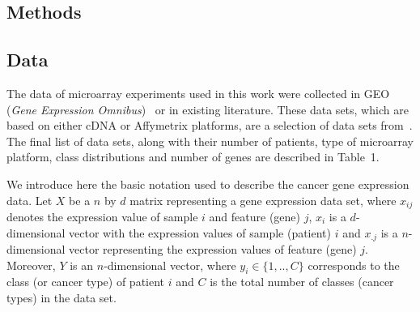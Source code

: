 \documentclass[10pt]{bmc_article}
\newenvironment{bmcformat}{\begin{raggedright}\baselineskip20pt\sloppy\setboolean{publ}{false}}{\end{raggedright}\baselineskip20pt\sloppy}
\begin{document}
\begin{bmcformat}
%



\section*{Methods}

\subsection*{Data}

The data of microarray experiments used in this work were collected in
GEO (\emph{Gene Expression Omnibus})~\cite{Barret2007} or in existing
literature. These data sets, which are based on either cDNA or
Affymetrix platforms, are a selection of data sets
from~\cite{Souto2008}. The final list of data sets, along with their
number of patients, type of microarray platform, class distributions
and number of genes are described in Table~1.

We introduce here the basic notation used to describe the cancer gene
expression data. Let  $X$ be a $n$ by $d$ matrix representing a gene
expression data set, where $x_{ij}$ denotes the expression value of
sample $i$ and feature (gene) $j$, $x_i$ is a $d$-dimensional vector with the
expression values of sample (patient) $i$ and $x_{.j}$ is a
$n$-dimensional vector representing the expression values of feature
(gene) $j$. Moreover, $Y$ is an $n$-dimensional vector, where $y_i \in
\{1,..,C\}$ corresponds to the class (or cancer type) of patient $i$ and
$C$ is the total number of classes (cancer types) in the data set.


\end{bmcformat}
\end{document}
